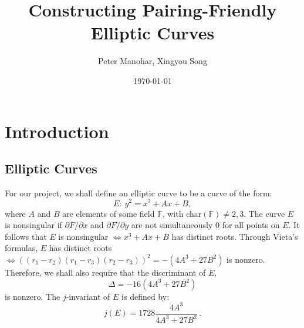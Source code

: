 \documentclass[12pt,twoside]{article}
\title{Constructing Pairing-Friendly Elliptic Curves }
\date{\today}
\author{ Peter Manohar, Xingyou Song}
\begin{document}
\maketitle


\tableofcontents

\section{Introduction}



\subsection{Elliptic Curves}

For our project, we shall define an elliptic curve to be a curve of the form:
\begin{equation}
E: \ y^2 = x^3 + Ax + B,
\end{equation}
where $A$ and $B$ are elements of some field $\mathbb F$, with char$(\mathbb F) \ne 2,3$. The curve $E$ is nonsingular if $\partial F / \partial x$ and $\partial F / \partial y$ are not simultaneously $0$ for all points on $E$. It follows that $E$ is nonsingular $\iff x^3+ Ax+ B$ has distinct roots. Through Vieta's formulas, $E$ has distinct roots $\iff ((r_{1} - r_{2})(r_{1} - r_{3})(r_{2} - r_{3}))^{2} = -(4A^{3} + 27B^{2})$ is nonzero. Therefore, we shall also require that the discriminant of $E$,
\begin{equation} 
\Delta = -16(4A^{3} + 27B^{2})
\end{equation}
is nonzero. 
The $j$-invariant of $E$ is defined by:
\begin{equation}
j(E) = 1728 \frac{4A^{3}}{4A^{3} + 27B^{2}} \, .
\end{equation}
\end{document}
